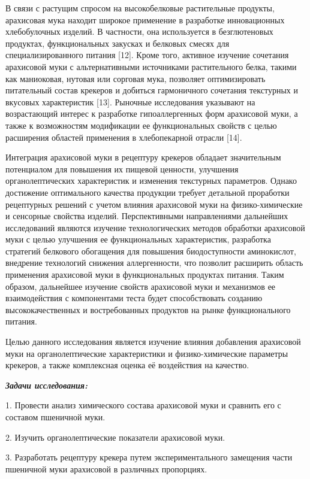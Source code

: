 {{{В связи с растущим спросом на высокобелковые растительные продукты,
арахисовая мука находит широкое применение в разработке инновационных
хлебобулочных изделий. В частности, она используется в безглютеновых
продуктах, функциональных закусках и белковых смесях для
специализированного питания {[}12{]}. Кроме того, активное изучение
сочетания арахисовой муки с альтернативными источниками растительного
белка, такими как маниоковая, нутовая или сорговая мука, позволяет
оптимизировать питательный состав крекеров и добиться гармоничного
сочетания текстурных и вкусовых характеристик {[}13{]}. Рыночные
исследования указывают на возрастающий интерес к разработке
гипоаллергенных форм арахисовой муки, а также к возможностям модификации
ее функциональных свойств с целью расширения областей применения в
хлебопекарной отрасли {[}14{]}.

Интеграция арахисовой муки в рецептуру крекеров обладает значительным
потенциалом для повышения их пищевой ценности, улучшения
органолептических характеристик и изменения текстурных параметров.
Однако достижение оптимального качества продукции требует детальной
проработки рецептурных решений с учетом влияния арахисовой муки на
физико-химические и сенсорные свойства изделий. Перспективными
направлениями дальнейших исследований являются изучение технологических
методов обработки арахисовой муки с целью улучшения ее функциональных
характеристик, разработка стратегий белкового обогащения для повышения
биодоступности аминокислот, внедрение технологий снижения аллергенности,
что позволит расширить область применения арахисовой муки в
функциональных продуктах питания. Таким образом, дальнейшее изучение
свойств арахисовой муки и механизмов ее взаимодействия с компонентами
теста будет способствовать созданию высококачественных и востребованных
продуктов на рынке функционального питания.

Целью данного исследования является изучение влияния добавления
арахисовой муки на органолептические характеристики и физико-химические
параметры крекеров, а также комплексная оценка её воздействия на
качество.

\emph{{\bfseries Задачи исследования:}}

1. Провести анализ химического состава арахисовой муки и сравнить его с
составом пшеничной муки.

2. Изучить органолептические показатели арахисовой муки.

3. Разработать рецептуру крекера путем экспериментального замещения
части пшеничной муки арахисовой в различных пропорциях.

}}}
